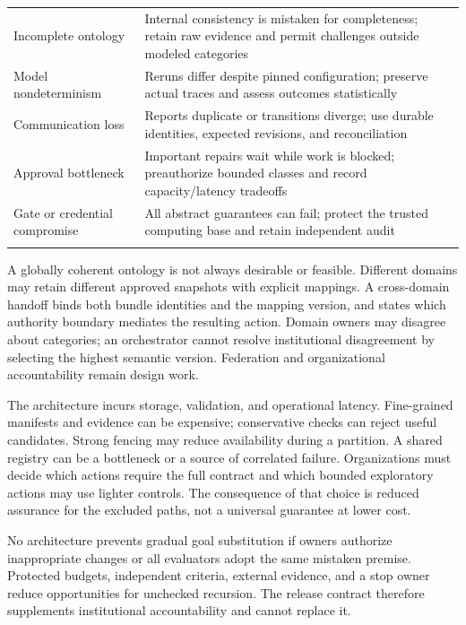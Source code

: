 \documentclass[preprint,12pt,authoryear]{elsarticle}
\begin{document}
\begin{table}[!htbp]
\begin{tabular}{@{}
  >{\raggedright\arraybackslash}p{}
  >{\raggedright\arraybackslash}p{}@{}}
Incomplete ontology & Internal consistency is mistaken for completeness;
retain raw evidence and permit challenges outside modeled categories \\
\addlinespace[4pt]
Model nondeterminism & Reruns differ despite pinned configuration;
preserve actual traces and assess outcomes statistically \\
\addlinespace[4pt]
Communication loss & Reports duplicate or transitions diverge; use
durable identities, expected revisions, and reconciliation \\
\addlinespace[4pt]
Approval bottleneck & Important repairs wait while work is blocked;
preauthorize bounded classes and record capacity/latency tradeoffs \\
\addlinespace[4pt]
Gate or credential compromise & All abstract guarantees can fail;
protect the trusted computing base and retain independent audit \\
\addlinespace[4pt]
\bottomrule
\end{tabular}
\end{table}


A globally coherent ontology is not always desirable or feasible.
Different domains may retain different approved snapshots with explicit
mappings. A cross-domain handoff binds both bundle identities and the
mapping version, and states which authority boundary mediates the
resulting action. Domain owners may disagree about categories; an
orchestrator cannot resolve institutional disagreement by selecting the
highest semantic version. Federation and organizational accountability
remain design work.

The architecture incurs storage, validation, and operational latency.
Fine-grained manifests and evidence can be expensive; conservative
checks can reject useful candidates. Strong fencing may reduce
availability during a partition. A shared registry can be a bottleneck
or a source of correlated failure. Organizations must decide which
actions require the full contract and which bounded exploratory actions
may use lighter controls. The consequence of that choice is reduced
assurance for the excluded paths, not a universal guarantee at lower
cost.

No architecture prevents gradual goal substitution if owners authorize
inappropriate changes or all evaluators adopt the same mistaken premise.
Protected budgets, independent criteria, external evidence, and a stop
owner reduce opportunities for unchecked recursion. The release contract
therefore supplements institutional accountability and cannot replace
it.
\end{document}
